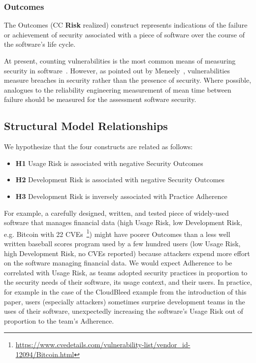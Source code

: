 
\subsubsection{Outcomes}
\label{sec:model_contruct_outcome}
The Outcomes (CC \textbf{Risk} realized) construct represents indications of the failure or achievement of security associated with a piece of software over the course of the software's life cycle.

 At present, counting vulnerabilities is the most common means of measuring security in software~\cite{morrison2014mapping}. However, as pointed out by Meneely~\cite{meneely2016security}, vulnerabilities measure breaches in security rather than the presence of security. Where possible, analogues to the reliability engineering measurement of mean time between failure should be measured for the assessment software security. 

\subsection{Structural Model Relationships}
We hypothesize that the four constructs are related as follows:
\begin{itemize}
	\item \textbf{H1} Usage Risk is associated with negative Security Outcomes
	\item \textbf{H2} Development Risk is associated with negative Security Outcomes
	\item \textbf{H3} Development Risk is inversely associated with Practice Adherence  	
\end{itemize}

For example, a carefully designed, written, and tested piece of widely-used software that manages financial data (high Usage Risk, low Development Risk, e.g. Bitcoin with 22 CVEs~\footnote{\url{https://www.cvedetails.com/vulnerability-list/vendor_id-12094/Bitcoin.html}}) might have poorer Outcomes than a less well written baseball scores program used by a few hundred users (low Usage Risk, high Development Risk, no CVEs reported) because attackers expend more effort on the software managing financial data. We would expect Adherence to be correlated with Usage Risk, as teams adopted security practices in proportion to the security needs of their software, its usage context, and their users. In practice, for example in the case of the CloudBleed example from the introduction of this paper, users (especially attackers) sometimes surprise development teams in the uses of their software, unexpectedly increasing the software's Usage Risk out of proportion to the team's Adherence. 

